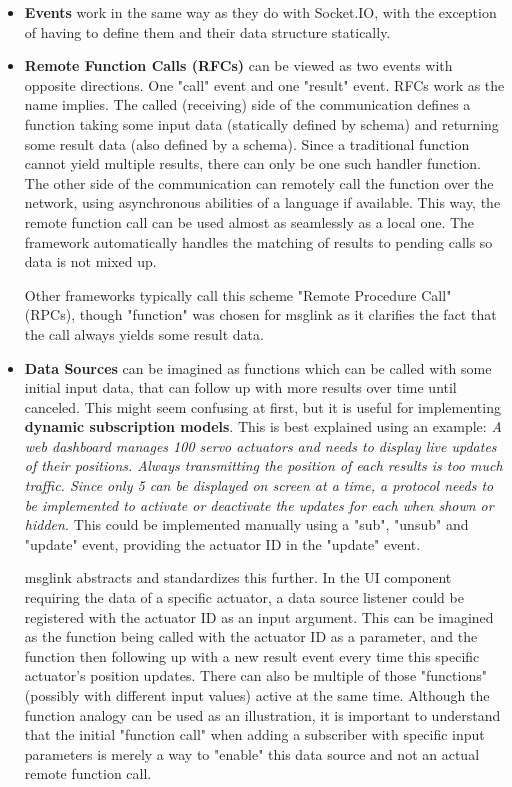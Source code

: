 \documentclass[conference]{IEEEtran}
\begin{document}
\begin{itemize}
    \item \textbf{Events} work in the same way as they do with Socket.IO, with the exception of having to define them and their data structure statically.
    \item \textbf{Remote Function Calls (RFCs)} can be viewed as two events with opposite directions. One "call" event and one "result" event. RFCs work as the name implies. The called (receiving) side of the communication defines a function taking some input data (statically defined by schema) and returning some result data (also defined by a schema). Since a traditional function cannot yield multiple results, there can only be one such handler function. The other side of the communication can remotely call the function over the network, using asynchronous abilities of a language if available. This way, the remote function call can be used almost as seamlessly as a local one. The framework automatically handles the matching of results to pending calls so data is not mixed up. 

    Other frameworks typically call this scheme "Remote Procedure Call" (RPCs), though "function" was chosen for msglink as it clarifies the fact that the call always yields some result data.
    \item \textbf{Data Sources} can be imagined as functions which can be called with some initial input data, that can follow up with more results over time until canceled. This might seem confusing at first, but it is useful for implementing \textbf{dynamic subscription models}. This is best explained using an example: \textit{A web dashboard manages 100 servo actuators and needs to display live updates of their positions. Always transmitting the position of each results is too much traffic. Since only 5 can be displayed on screen at a time, a protocol needs to be implemented to activate or deactivate the updates for each when shown or hidden.} This could be implemented manually using a "sub", "unsub" and "update" event, providing the actuator ID in the "update" event.
    
    msglink abstracts and standardizes this further. In the UI component requiring the data of a specific actuator, a data source listener could be registered with the actuator ID as an input argument. This can be imagined as the function being called with the actuator ID as a parameter, and the function then following up with a new result event every time this specific actuator's position updates. There can also be multiple of those "functions" (possibly with different input values) active at the same time. Although the function analogy can be used as an illustration, it is important to understand that the initial "function call" when adding a subscriber with specific input parameters is merely a way to "enable" this data source and not an actual remote function call.
\end{itemize}
\end{document}
